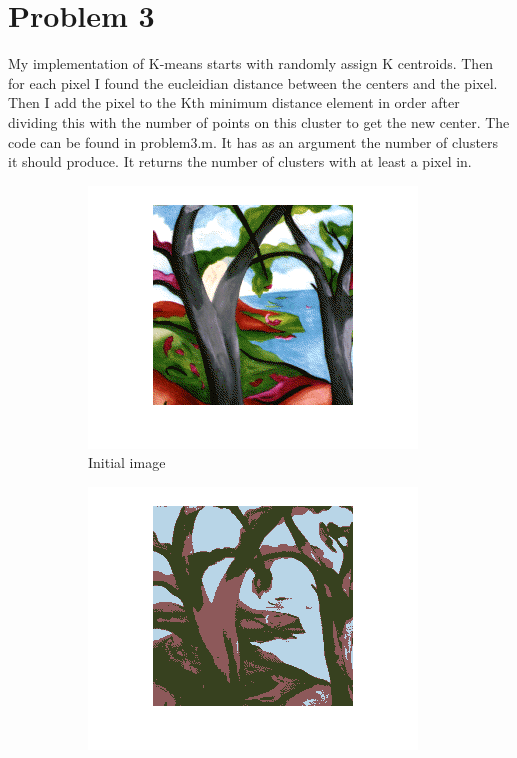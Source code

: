 \section{Problem 3}
My implementation of K-means starts with randomly assign K centroids.
Then for each pixel I found the eucleidian distance between the centers
and the pixel. Then I add the pixel to the Kth minimum distance element
in order after dividing this with the number of points on this cluster to
get the new center. The code can be found in problem3.m. It has as an
argument the number of clusters it should produce. It returns the number
of clusters with at least a pixel in.
\begin{figure}[ht] 
  \begin{subfigure}[b]{0.5\linewidth}
    \centering
    \includegraphics[width=0.75\linewidth]{figures/initial.png}
    \caption{Initial image} 
    \vspace{4ex}
  \end{subfigure}%
  \begin{subfigure}[b]{0.5\linewidth}
    \centering
    \includegraphics[width=0.75\linewidth]{figures/kmeans3.png} 

\end{subfigure}
\end{figure}
